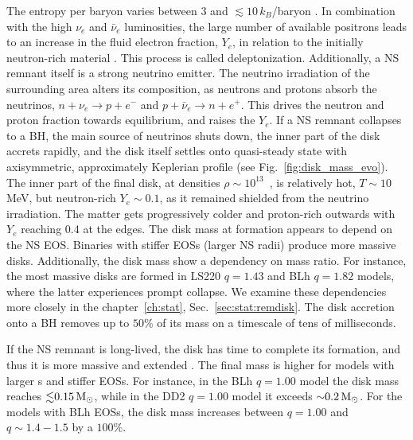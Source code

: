 The entropy per baryon varies between $3$ and $\lesssim 10\,$$k_{B}$/baryon \citep{Perego:2019adq}.
In combination with the high $\nu_e$ and $\bar{\nu}_e$ luminosities,
the large number of available positrons leads to an increase 
in the fluid electron fraction, $Y_e$, in relation to the initially neutron-rich material
\citep{Qian:1996xt}.
This process is called deleptonization. 
%
Additionally, a \ac{NS} remnant itself is a strong neutrino emitter. The neutrino irradiation of the 
surrounding area alters its composition, as neutrons and protons absorb the neutrinos,
$n+\nu_e\rightarrow p + e^{-}$ and $p + \bar{\nu}_e\rightarrow n + e^+$.
This drives the neutron and proton fraction towards equilibrium, and raises the $Y_e$.
If a \ac{NS} remnant collapses to a \ac{BH}, the main source of neutrinos shuts down,  
the inner part of the disk accrets rapidly, and the disk itself settles onto quasi-steady state 
with axisymmetric, approximately Keplerian profile (see Fig.~\ref{fig:disk_mass_evo}).
%
The inner part of the final disk, at densities $\rho\sim10^{13}$~\gcm, 
is relatively hot, $T\sim10\,$ MeV, but neutron-rich $Y_e\sim0.1$, as it 
remained shielded 
from the neutrino irradiation. The matter gets progressively colder and proton-rich 
outwards with $Y_e$ reaching $0.4$ at the edges.
%
The disk mass at formation appears to depend on the \ac{NS} \ac{EOS}. Binaries with 
stiffer \acp{EOS} (larger \ac{NS} radii) produce more massive disks.
Additionally, the disk mass show a dependency on mass ratio. For instance, the most massive 
disks are formed in LS220 $q=1.43$ and  BLh $q=1.82$ models, where the latter experiences prompt collapse.
%
We examine these dependencies more closely in the chapter~\ref{ch:stat}, Sec.~\ref{sec:stat:remdisk}.
The disk accretion onto a \ac{BH} removes up to $50\%$ of its mass on a timescale of tens of milliseconds.



If the \ac{NS} remnant is long-lived, the disk has time to complete its formation,
and thus it is more massive and extended \citep{Perego:2019adq}. 
The final mass is higher for models with larger \mr{}s and stiffer \acp{EOS}.
For instance, 
in the BLh $q=1.00$ model
the disk mass reaches ${\lesssim}0.15\,{\text{M}_{\odot}}$, while in the 
DD2 $q=1.00$ model 
it exceeds ${\sim}0.2\,{\text{M}_{\odot}}$. For the models with BLh \acp{EOS}, 
the disk mass increases between $q=1.00$ and $q\sim1.4-1.5$ by a $100\%$.

